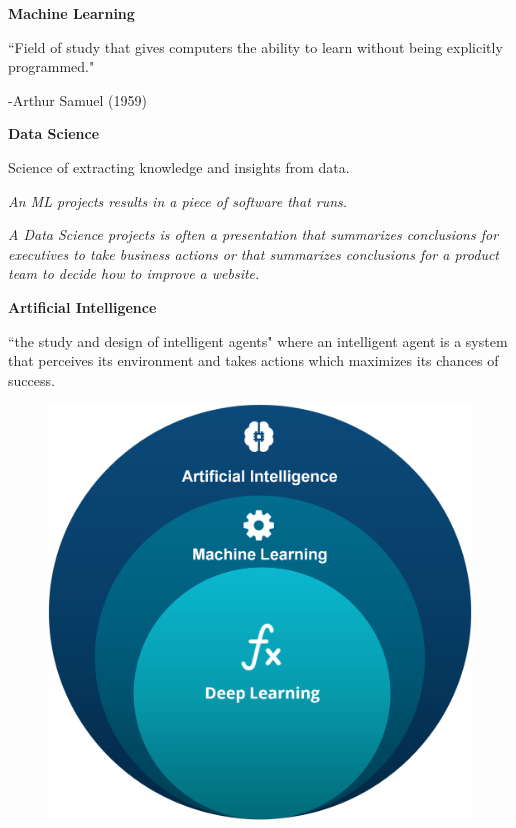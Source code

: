 \documentclass[10pt, compress]{beamer}
\begin{document}
\begin{frame}
  \begin{multicols}{2}
  \textbf{Machine Learning}

  ``Field of study that gives computers the ability to learn without being explicitly programmed."

  -Arthur Samuel (1959)

  \columnbreak

  \textbf{Data Science}

  Science of extracting knowledge and insights from data.


  \end{multicols}

  \begin{multicols}{2}
    \textit{An ML projects results in a piece of software that runs.}

    \columnbreak

    \textit{A Data Science projects is often a presentation that summarizes conclusions for executives to take business actions or that summarizes conclusions for a product team to decide how to improve a website.}

  \end{multicols}
\end{frame}

\begin{frame}
  \begin{multicols}{2}
  \textbf{Artificial Intelligence} \\ \hfill \break

  ``the study and design of intelligent agents" where an intelligent agent is a system that perceives its environment and takes actions which maximizes its chances of success.

  \columnbreak

  \begin{figure}
    \includegraphics[width=.9\linewidth]{imgs/venn_ai_ml_dl}
  \end{figure}

  \end{multicols}
\end{frame}
\end{document}
